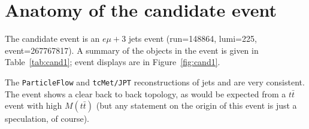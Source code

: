 \setcounter{table}{0}
\renewcommand\thetable{\Alph{section}.\arabic{table}}
\setcounter{figure}{0}
\renewcommand\thefigure{\Alph{section}.\arabic{figure}}
\section{Anatomy of the candidate event}
\label{sec:cand}
The candidate event is an $e\mu + 3$ jets event (run=148864, lumi=225,
event=267767817).  A summary of the objects in the event is given in
Table~\ref{tab:cand1}; event displays are in Figure~\ref{fig:cand1}.

The {\tt ParticleFlow} and {\tt tcMet/JPT} reconstructions of
jets and \met are very consistent. The event shows a clear back
to back topology, as would be expected from a $t\bar{t}$ event
with high $M(t\bar{t})$ (but any statement on the origin of this
event is just a speculation, of course).

